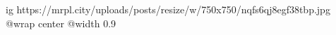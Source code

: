  
 
 
 
 

\ifcmt
  ig https://mrpl.city/uploads/posts/resize/w/750x750/nqfs6qj8egf38tbp.jpg
  @wrap center
  @width 0.9
\fi
